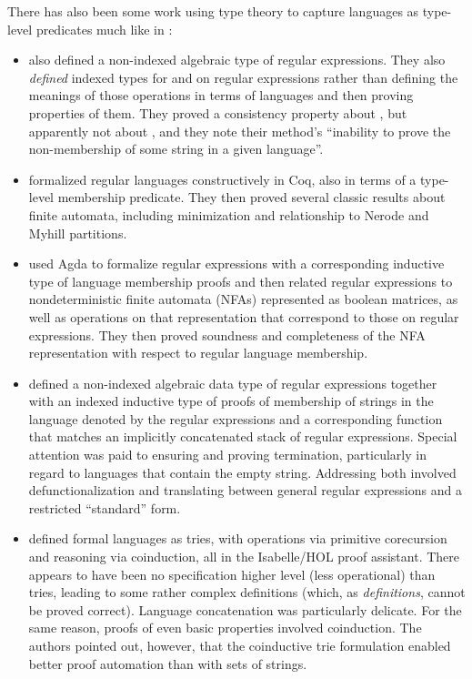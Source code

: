 \documentclass[acmsmall,screen,anonymous,timestamp]{acmart}
\begin{document}
There has also been some work using type theory to capture languages as type-level predicates much like in :
\begin{itemize}

\item \citet{AgularMannaa2009} also defined a non-indexed algebraic type of regular expressions.
They also \emph{defined} indexed types for  and  on regular expressions rather than defining the meanings of those operations in terms of languages and then proving properties of them.
They proved a consistency property about , but apparently not about , and they note their method's ``inability to prove the non-membership of some string in a given language''.

\item \citet{DoczkalEtAl2013} formalized regular languages constructively in Coq, also in terms of a type-level membership predicate.
They then proved several classic results about finite automata, including minimization and relationship to Nerode and Myhill partitions.

\item \citet{FirsovUustalu2013} used Agda to formalize regular expressions with a corresponding inductive type of language membership proofs and then related regular expressions to nondeterministic finite automata (NFAs) represented as boolean matrices, as well as operations on that representation that correspond to those on regular expressions.
They then proved soundness and completeness of the NFA representation with respect to regular language membership.

\item \citet{KorkutEtAl2016} defined a non-indexed algebraic data type of regular expressions together with an indexed inductive type of proofs of membership of strings in the language denoted by the regular expressions and a corresponding function that matches an implicitly concatenated stack of regular expressions.
Special attention was paid to ensuring and proving termination, particularly in regard to languages that contain the empty string.
Addressing both involved defunctionalization and translating between general regular expressions and a restricted ``standard'' form.

\item \citet{Traytel2017} defined formal languages as tries, with operations via primitive corecursion and reasoning via coinduction, all in the Isabelle/HOL proof assistant.
There appears to have been no specification higher level (less operational) than tries, leading to some rather complex definitions (which, as \emph{definitions}, cannot be proved correct).
Language concatenation was particularly delicate.
For the same reason, proofs of even basic properties involved coinduction.
The authors pointed out, however, that the coinductive trie formulation enabled better proof automation than with sets of strings.


\end{itemize}
\end{document}
